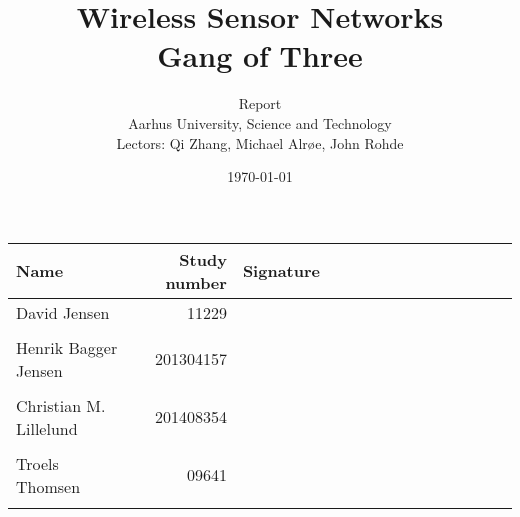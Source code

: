 \documentclass[a4paper,11pt,oneside]{memoir}
\title{Wireless Sensor Networks \\ Gang of Three}
\author{Report \\ Aarhus University, Science and Technology \\ Lectors: Qi Zhang, Michael Alrøe, John Rohde }
\date{\today}
\begin{document}
\fancyhf{} %
\frontmatter
\maketitle
\vfill



\begin{table} [h]
	\centering
	\begin{tabular}{|l|r|l|}
		\hline 
		\textbf{Name} 				& \textbf{Study number} & \textbf{Signature~~~~~~~~~~~~~~~~~~~~} 	\\ \hline
		David Jensen 				& 11229 	& \\ && 												\\ \hline
		Henrik Bagger Jensen 		& 201304157 & \\ && 												\\ \hline
		Christian M. Lillelund 		& 201408354 & \\ && 												\\ \hline
		Troels Thomsen 				& 09641		& \\ && 												\\ \hline
		
	\end{tabular}
\end{table}

\clearpage
\pagestyle{plain}

\tableofcontents

\vfill

\mainmatter
\pagestyle{fancy}
\fancyhf{} %
\fancyhead[CE,CO]{\nouppercase{\leftmark}}
\fancyfoot[CO,CE]{\nouppercase{\rightmark}}
\fancyfoot[LE,RO]{\thepage}

\begin{multicols}{2}
								    \clearpage
								        \clearpage
										\clearpage
									\clearpage
									\clearpage
\end{multicols}
\end{document}
